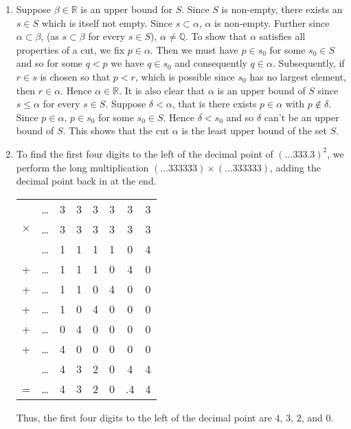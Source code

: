 \documentclass[a4paper,11pt]{article}
\newcommand{\ds}{\displaystyle}
\begin{document}
{{\begin{enumerate}[leftmargin=*]
		\item Suppose $\ds{\beta \in \mathbb{R}}$ is an upper bound for $\ds{S}$. Since $\ds{S}$ is non-empty, there exists an $\ds{s \in S}$ which is itself not empty. Since $\ds{s \subset \alpha}$, $\ds{\alpha}$ is non-empty. Further since $\ds{\alpha \subset \beta}$, (as $\ds{s \subset \beta}$ for every $\ds{s \in S}$), $\ds{\alpha \neq \mathbb{Q}}$. To show that $\ds{\alpha}$ satisfies all properties of a cut, we fix $\ds{p \in \alpha}$. Then we must have $\ds{p \in s_0}$ for some $\ds{s_0 \in S}$ and so for some $\ds{q < p}$ we have $\ds{q \in s_0}$ and consequently $\ds{q \in \alpha}$. Subsequently, if $\ds{r \in s}$ is chosen so that $\ds{p < r}$, which is possible since $\ds{s_0}$ has no largest element, then $\ds{r \in \alpha}$. Hence $\ds{\alpha \in \mathbb{R}}$. It is also clear that $\ds{\alpha}$ is an upper bound of $\ds{S}$ since $\ds{s \leq \alpha}$ for every $\ds{s \in S}$. Suppose $\ds{\delta < \alpha}$, that is there exists $\ds{p \in \alpha}$ with $\ds{p \notin \delta}$. Since $\ds{p \in \alpha}$, $\ds{p \in s_0}$ for some $\ds{s_0 \in S}$. Hence $\ds{\delta < s_0}$ and so $\ds{\delta}$ can’t be an upper bound of $\ds{S}$. This shows that the cut $\ds{\alpha}$ is the least upper bound of the set $\ds{S}$.
		\item To find the first four digits to the left of the decimal point of $\ds{(\dots 333.3)^2}$, we perform the long multiplication $\ds{(\dots 333333)\times(\dots 333333)}$, adding the decimal point back in at the end.
			\begin{center}
				\begin{tabular}{c@{\,}c@{\,}c@{\,}c@{\,}c@{\,}c@{\,}c@{\,}c}
					& \dots & 3 & 3 & 3 & 3 & 3 & 3\\
					$\times$ & \dots & 3 & 3 & 3 & 3 & 3 & 3\\
					\hline
					& \dots & 1 & 1 & 1 & 1 & 0 & 4\\
					+ & \dots & 1 & 1 & 1 & 0 & 4 & 0\\
					+ & \dots & 1 & 1 & 0 & 4 & 0 & 0\\
					+ & \dots & 1 & 0 & 4 & 0 & 0 & 0\\
					+ & \dots & 0 & 4 & 0 & 0 & 0 & 0\\
					+ & \dots & 4 & 0 & 0 & 0 & 0 & 0\\
					\hline
					& \dots & 4 & 3 & 2 & 0 & 4 & 4\\
					= & \dots & 4 & 3 & 2 & 0 & .4 & 4\\
				\end{tabular}
			\end{center}
			Thus, the first four digits to the left of the decimal point are $\ds{4}$, $\ds{3}$, $\ds{2}$, and $\ds{0}$.


\end{enumerate}}}
\end{document}
